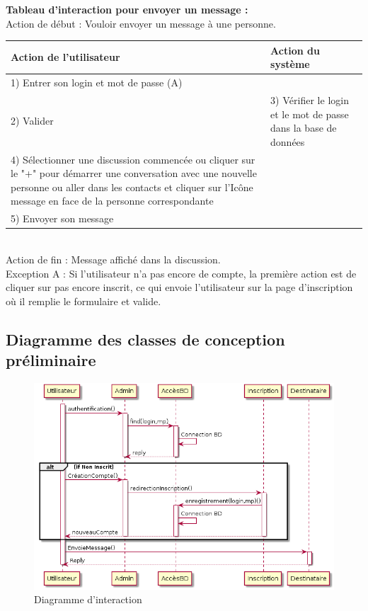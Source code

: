 \documentclass[a4paper,12pt]{article}
\begin{document}
	\textbf{Tableau d’interaction pour envoyer un message :} \\

	Action de début : Vouloir envoyer un message à une personne. \\

	\begin{tabular}{|p{7cm}|p{7cm}|}
		\hline
		Action de l'utilisateur & Action du système\tabularnewline
		\hline

		\hline
		1) Entrer son login et mot de passe (A)  & \tabularnewline

		\hline
		2) Valider  & 3) Vérifier le login et le mot de passe dans la base de données\tabularnewline

		\hline
		4) Sélectionner une discussion commencée ou cliquer sur le "+" pour	démarrer une conversation avec une nouvelle personne ou aller dans les contacts et cliquer sur l’Icône message en face de la personne correspondante & \tabularnewline

		\hline
		5) Envoyer son message  & \tabularnewline
		\hline
	\end{tabular}

~\\

	Action de fin  : Message affiché dans la discussion. \\

	Exception A : Si l'utilisateur n'a pas encore de compte, la première action est de cliquer sur pas encore inscrit, ce qui envoie l'utilisateur sur la page d'inscription où il remplie le formulaire et valide.

	\subsection{Diagramme des classes de conception préliminaire}
	\begin{figure}[H]
		\centerline{\includegraphics[width=12.5cm]{../diagrammes/img/interaction.png}}
		\caption{Diagramme d’interaction}
	\end{figure}
\end{document}
